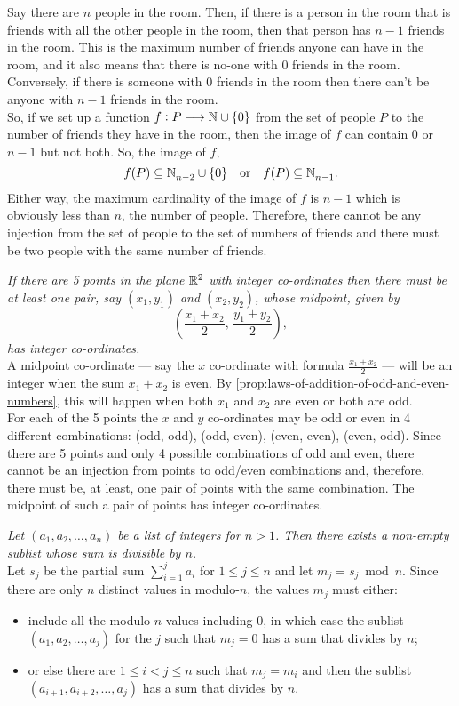 \documentclass[../MathsNotesBase.tex]{subfiles}
\begin{document}
{\begin{exe}
			Say there are $n$ people in the room. Then, if there is a person in the room that is friends with all the other people in the room, then that person has ${ n - 1 }$ friends in the room. This is the maximum number of friends anyone can have in the room, and it also means that there is no-one with 0 friends in the room. Conversely, if there is someone with 0 friends in the room then there can't be anyone with ${ n - 1 }$ friends in the room.\\
			So, if we set up a function ${ f: P \longmapsto \mathbb{N}^{} \cup \{0\} }$ from the set of people $P$ to the number of friends they have in the room, then the image of $f$ can contain 0 or $n-1$ but not both. So, the image of $f$,
			\[ f(P) \subseteq \mathbb{N}^{}_{n-2} \cup \{0\} \hspace{10pt}\text{or}\hspace{10pt} f(P) \subseteq \mathbb{N}^{}_{n-1}. \]
			Either way, the maximum cardinality of the image of $f$ is ${ n - 1 }$ which is obviously less than $n$, the number of people. Therefore, there cannot be any injection from the set of people to the set of numbers of friends and there must be two people with the same number of friends.
			
			\ex \textit{If there are 5 points in the plane $\mathbb{R}^{2}$ with integer co-ordinates then there must be at least one pair, say $(x_1,y_1)$ and $(x_2,y_2)$, whose midpoint, given by
				\[ \left( \frac{x_1 + x_2}{2}, \, \frac{y_1 + y_2}{2} \right), \]
				has integer co-ordinates.}\\
			
			A midpoint co-ordinate --- say the $x$ co-ordinate with formula ${ \frac{x_1 + x_2}{2} }$ --- will be an integer when the sum ${ x_1 + x_2 }$ is even. By \autoref{prop:laws-of-addition-of-odd-and-even-numbers}, this will happen when both $x_1$ and $x_2$ are even or both are odd.\\
			For each of the 5 points the $x$ and $y$ co-ordinates may be odd or even in 4 different combinations: (odd, odd), (odd, even), (even, even), (even, odd). Since there are 5 points and only 4 possible combinations of odd and even, there cannot be an injection from points to odd/even combinations and, therefore, there must be, at least, one pair of points with the same combination. The midpoint of such a pair of points has integer co-ordinates.
			
			\ex \textit{Let ${ (a_1,a_2,\dots, a_n) }$ be a list of integers for ${ n > 1 }$. Then there exists a non-empty sublist whose sum is divisible by $n$.}\\
			
			Let $s_j$ be the partial sum ${ \sum_{i=1}^j a_i }$ for ${ 1 \leq j \leq n }$ and let ${ m_j = s_j \bmod n }$. Since there are only $n$ distinct values in modulo-$n$, the values $m_j$ must either:
			\begin{itemize}
				\item include all the modulo-$n$ values including 0, in which case the sublist ${ (a_1,a_2,\dots, a_j) }$ for the $j$ such that ${ m_j = 0 }$ has a sum that divides by $n$;
				\item or else there are ${ 1 \leq i < j \leq n }$ such that ${ m_j = m_i }$ and then the sublist ${ (a_{i+1},a_{i+2}, \dots, a_j) }$ has a sum that divides by $n$.
			\end{itemize}
			

\end{exe}}
\end{document}
